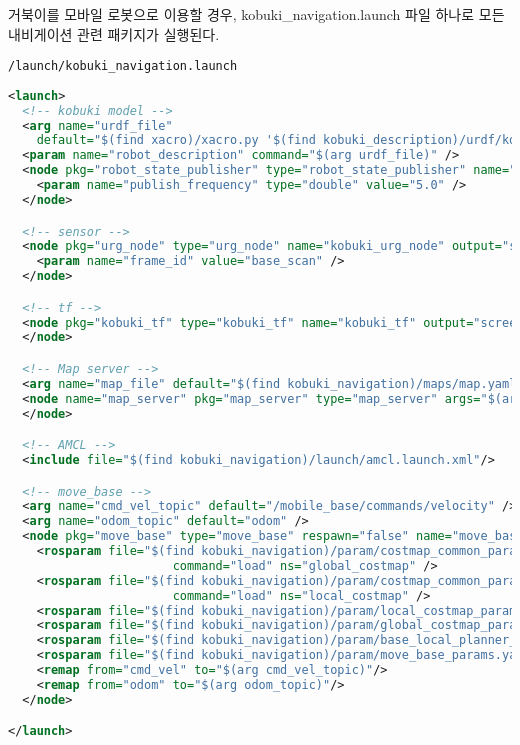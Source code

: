거북이를 모바일 로봇으로 이용할 경우, kobuki\_navigation.launch 파일 하나로 모든 내비게이션 관련 패키지가 실행된다. 

\vspace{\baselineskip}
\begin{lstlisting}[language=ROS]
/launch/kobuki_navigation.launch
\end{lstlisting}

\vspace{\baselineskip}
\begin{lstlisting}[language=XML]
<launch>
  <!-- kobuki model -->
  <arg name="urdf_file" 
    default="$(find xacro)/xacro.py '$(find kobuki_description)/urdf/kobuki_standalone.urdf.xacro'" />
  <param name="robot_description" command="$(arg urdf_file)" />
  <node pkg="robot_state_publisher" type="robot_state_publisher" name="robot_state_publisher" output="screen">
    <param name="publish_frequency" type="double" value="5.0" />
  </node>

  <!-- sensor -->
  <node pkg="urg_node" type="urg_node" name="kobuki_urg_node" output="screen">
    <param name="frame_id" value="base_scan" />
  </node>

  <!-- tf -->
  <node pkg="kobuki_tf" type="kobuki_tf" name="kobuki_tf" output="screen">
  </node>

  <!-- Map server -->
  <arg name="map_file" default="$(find kobuki_navigation)/maps/map.yaml"/>
  <node name="map_server" pkg="map_server" type="map_server" args="$(arg map_file)">
  </node>

  <!-- AMCL -->
  <include file="$(find kobuki_navigation)/launch/amcl.launch.xml"/>

  <!-- move_base -->  
  <arg name="cmd_vel_topic" default="/mobile_base/commands/velocity" />
  <arg name="odom_topic" default="odom" />
  <node pkg="move_base" type="move_base" respawn="false" name="move_base" output="screen">
    <rosparam file="$(find kobuki_navigation)/param/costmap_common_params.yaml" 
                       command="load" ns="global_costmap" />
    <rosparam file="$(find kobuki_navigation)/param/costmap_common_params.yaml"
                       command="load" ns="local_costmap" />
    <rosparam file="$(find kobuki_navigation)/param/local_costmap_params.yaml" command="load" />
    <rosparam file="$(find kobuki_navigation)/param/global_costmap_params.yaml" command="load" />
    <rosparam file="$(find kobuki_navigation)/param/base_local_planner_params.yaml" command="load" />
    <rosparam file="$(find kobuki_navigation)/param/move_base_params.yaml" command="load" />
    <remap from="cmd_vel" to="$(arg cmd_vel_topic)"/>
    <remap from="odom" to="$(arg odom_topic)"/>
  </node>

</launch>
\end{lstlisting}

